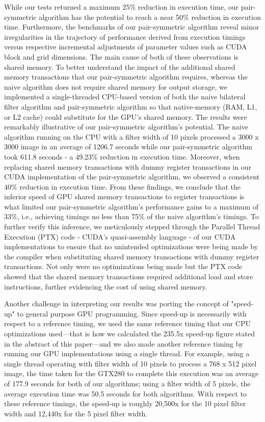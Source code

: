 \documentclass{IEEEtran}
\begin{document}
While our tests returned a maximum 25\% reduction in execution time, our pair-symmetric algorithm has the potential to reach a near 50\% reduction in execution time. Furthermore, the benchmarks of our pair-symmetric algorithm reveal minor irregularities in the trajectory of performance derived from execution timings versus respective incremental adjustments of parameter values such as CUDA block and grid dimensions. The main cause of both of these observations is shared memory. To better understand the impact of the additional shared memory transactions that our pair-symmetric algorithm requires, whereas the naive algorithm does not require shared memory for output storage, we implemented a single-threaded CPU-based version of both the naive bilateral filter algorithm and pair-symmetric algorithm so that native-memory (RAM, L1, or L2 cache) could substitute for the GPU's shared memory. The results were remarkably illustrative of our pair-symmetric algorithm's potential. The naive algorithm running on the CPU with a filter width of 10 pixels processed a 3000 x 3000 image in an average of 1206.7 seconds while our pair-symmetric algorithm took 611.8 seconds - a 49.23\% reduction in execution time. Moreover, when replacing shared memory transactions with dummy register transactions in our CUDA implementation of the pair-symmetric algorithm, we observed a consistent 40\% reduction in execution time. From these findings, we conclude that the inferior speed of GPU shared memory transactions to register transactions is what limited our pair-symmetric algorithm's performance gains to  a maximum of 33\%, i.e., achieving timings no less than 75\% of the naive algorithm's timings. To further verify this inference, we meticulously stepped through the Parallel Thread Execution (PTX) code - CUDA's quasi-assembly language - of our CUDA implementations to ensure that no unintended optimizations were being made by the compiler when substituting shared memory transactions with dummy register transactions. Not only were no optimizations being made but the PTX code showed that the shared memory transactions required additional load and store instructions, further evidencing the cost of using shared memory.

Another challenge in interpreting our results was porting the concept of "speed-up" to general purpose GPU programming. Since speed-up is necessarily with respect to a reference timing, we used the same reference timing that our CPU optimizations used---that is how we calculated the 235.5x speed-up figure stated in the abstract of this paper---and we also made another reference timing by running our GPU implementations using a single thread. For example, using a single thread operating with filter width of 10 pixels to process a 768 x 512 pixel image, the time taken for the GTX280 to complete this execution was an average of 177.9 seconds for both of our algorithms; using a filter width of 5 pixels, the average execution time was 50.5 seconds for both algorithms. With respect to these reference timings, the speed-up is roughly 20,500x for the 10 pixel filter width and 12,440x for the 5 pixel filter width.
\end{document}
